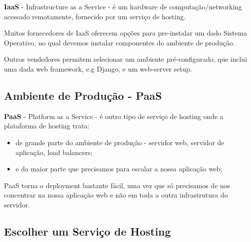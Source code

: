 \documentclass{article}
\begin{document}
\begin{flushleft}
  \textbf{IaaS} - Infrastructure as a Service - é um hardware de computação/networking
  acessado remotamente, fornecido por um serviço de hosting.

  \vspace{2mm}

  Muitos fornecedores de IaaS oferecem opções para pre-instalar um dado Sistema Operativo,
  no qual devemos instalar componentes do ambiente de produção.

  \vspace{2mm}

  Outros vendedores permitem selecionar um ambiente pré-configurado, que inclui
  uma dada web framework, e.g Django, e um web-server setup.
\end{flushleft}

\pagebreak

\subsection{Ambiente de Produção - PaaS}

\begin{flushleft}
  \textbf{PaaS} - Platform as a Service - é outro tipo de serviço de hosting onde
  a plataforma de hosting trata:
  \begin{itemize}
    \item de grande parte do ambiente de produção - servidor web, servidor de aplicação,
    load balancers;
    \item e da maior parte que precisamos para escalar a nossa aplicação web;
  \end{itemize}

  PaaS torna o deployment bastante fácil, uma vez que só precisamos de nos concentrar
  na nossa aplicação web e não em toda a outra infrastrutura do servidor.
\end{flushleft}

\subsection{Escolher um Serviço de Hosting}
\end{document}
